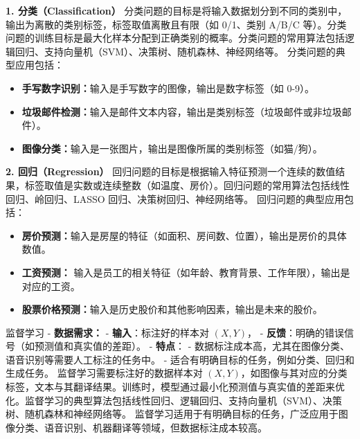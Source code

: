 {\bf  1. 分类（Classification）}
分类问题的目标是将输入数据划分到不同的类别中，输出为离散的类别标签，标签取值离散且有限（如 0/1、类别 A/B/C 等）。分类问题的训练目标是最大化样本分配到正确类别的概率。分类问题的常用算法包括逻辑回归、支持向量机（SVM）、决策树、随机森林、神经网络等。
分类问题的典型应用包括：
\begin{itemize}
\item {\bf 手写数字识别：}输入是手写数字的图像，输出是数字标签（如 0-9）。
 \item {\bf  垃圾邮件检测：}输入是邮件文本内容，输出是类别标签（垃圾邮件或非垃圾邮件）。
\item {\bf  图像分类：}输入是一张图片，输出是图像所属的类别标签（如猫/狗）。
\end{itemize}
 {\bf  2. 回归（Regression）}
 回归问题的目标是根据输入特征预测一个连续的数值结果，标签取值是实数或连续整数（如温度、房价）。回归问题的常用算法包括线性回归、岭回归、LASSO 回归、决策树回归、神经网络等。
回归问题的典型应用包括：
\begin{itemize}
 \item {\bf 房价预测：}输入是房屋的特征（如面积、房间数、位置），输出是房价的具体数值。
\item {\bf  工资预测：} 输入是员工的相关特征（如年龄、教育背景、工作年限），输出是对应的工资。
 \item {\bf 股票价格预测：}输入是历史股价和其他影响因素，输出是未来的股价。
\end{itemize}
%
监督学习
- {\bf 数据需求：}
  - {\bf 输入}：标注好的样本对 $(X, Y)$，
  - {\bf 反馈}：明确的错误信号（如预测值和真实值的差距）。
- {\bf 特点}：
  - 数据标注成本高，尤其在图像分类、语音识别等需要人工标注的任务中。
  - 适合有明确目标的任务，例如分类、回归和生成任务。
监督学习需要标注好的数据样本对 $(X, Y)$，如图像与其对应的分类标签，文本与其翻译结果。训练时，模型通过最小化预测值与真实值的差距来优化。监督学习的典型算法包括线性回归、逻辑回归、支持向量机（SVM）、决策树、随机森林和神经网络等。
监督学习适用于有明确目标的任务，广泛应用于图像分类、语音识别、机器翻译等领域，但数据标注成本较高。


